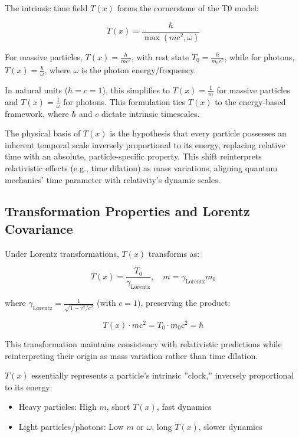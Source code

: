 \documentclass[aps,prl,twocolumn,superscriptaddress,nofootinbib]{revtex4-2}
\newcommand{\Tfield}{T(x)}
\newcommand{\Tzero}{T_0}
\newcommand{\gammaf}{\gamma_{\text{Lorentz}}}
\begin{document}
	The intrinsic time field $\Tfield$ forms the cornerstone of the T0 model:
	
	\begin{equation}
		\Tfield = \frac{\hbar}{\max(mc^2, \omega)}
		\label{eq:intrinsic_time}
	\end{equation}
	
	For massive particles, $\Tfield = \frac{\hbar}{mc^2}$, with rest state $\Tzero = \frac{\hbar}{m_0 c^2}$, while for photons, $\Tfield = \frac{\hbar}{\omega}$, where $\omega$ is the photon energy/frequency.
	
	In natural units ($\hbar = c = 1$), this simplifies to $\Tfield = \frac{1}{m}$ for massive particles and $\Tfield = \frac{1}{\omega}$ for photons. This formulation ties $\Tfield$ to the energy-based framework, where $\hbar$ and $c$ dictate intrinsic timescales.
	
	The physical basis of $\Tfield$ is the hypothesis that every particle possesses an inherent temporal scale inversely proportional to its energy, replacing relative time with an absolute, particle-specific property. This shift reinterprets relativistic effects (e.g., time dilation) as mass variations, aligning quantum mechanics' time parameter with relativity's dynamic scales.
	
	\subsection{Transformation Properties and Lorentz Covariance}
	\label{subsec:transformations}
	
	Under Lorentz transformations, $\Tfield$ transforms as:
	
	\begin{equation}
		\Tfield = \frac{\Tzero}{\gammaf}, \quad m = \gammaf m_0
		\label{eq:transform}
	\end{equation}
	
	where $\gammaf = \frac{1}{\sqrt{1 - v^2/c^2}}$ (with $c = 1$), preserving the product:
	
	\begin{equation}
		\Tfield \cdot m c^2 = \Tzero \cdot m_0 c^2 = \hbar
		\label{eq:invariant_product}
	\end{equation}
	
	This transformation maintains consistency with relativistic predictions while reinterpreting their origin as mass variation rather than time dilation.
	
	$\Tfield$ essentially represents a particle's intrinsic ''clock,'' inversely proportional to its energy:
	\begin{itemize}
		\item Heavy particles: High $m$, short $\Tfield$, fast dynamics
		\item Light particles/photons: Low $m$ or $\omega$, long $\Tfield$, slower dynamics
	\end{itemize}
	
\end{document}

